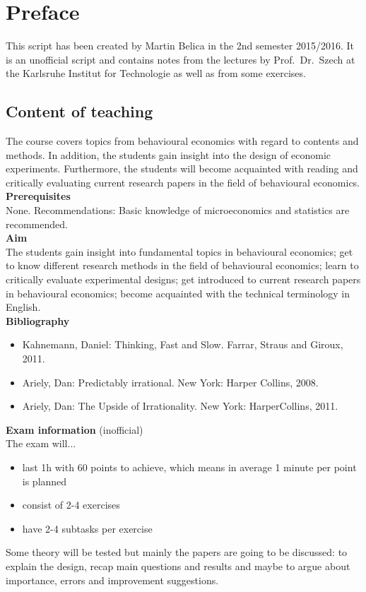 

\chapter*{Preface}
This script has been created by Martin Belica in the 2nd semester 2015/2016. It is an unofficial script and contains notes from the lectures by Prof.~Dr.~Szech at the Karlsruhe Institut for Technologie as well as from some exercises.
\section*{Content of teaching}
The course covers topics from behavioural economics with regard to contents and methods. In addition, the students gain insight into the design of economic experiments. Furthermore, the students will become acquainted with reading and critically evaluating current research papers in the field of behavioural economics. \\

\textbf{Prerequisites} \\
None. Recommendations: Basic knowledge of microeconomics and statistics are recommended. \\

\textbf{Aim} \\
The students gain insight into fundamental topics in behavioural economics;
get to know different research methods in the field of behavioural economics;
learn to critically evaluate experimental designs;
get introduced to current research papers in behavioural economics;
become acquainted with the technical terminology in English. \\

\textbf{Bibliography}
\begin{itemize}
	\item Kahnemann, Daniel: Thinking, Fast and Slow. Farrar, Straus and Giroux, 2011.
	\item Ariely, Dan: Predictably irrational. New York: Harper Collins, 2008.
	\item Ariely, Dan: The Upside of Irrationality. New York: HarperCollins, 2011. 
\end{itemize}

\textbf{Exam information} (inofficial) \\
The exam will...
\begin{itemize}
	\item last 1h with 60 points to achieve, which means in average 1 minute per point is planned
	\item consist of 2-4 exercises
	\item have 2-4 subtasks per exercise 
\end{itemize}
Some theory will be tested but mainly the papers are going to be discussed: to explain the design, recap main questions and results and maybe to argue about importance, errors and improvement suggestions.

